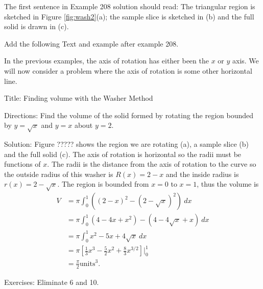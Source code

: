 \documentclass[10pt]{article}
\begin{document}
The first sentence in Example 208 solution should read:   The triangular region is sketched in Figure \ref{fig:wash2}(a); the sample slice is sketched in (b) and the full solid is drawn in (c). 


Add the following Text and example after example 208.

In the previous examples, the axis of rotation has either been the $x$ or $y$ axis. We will now consider a problem where the axis of rotation is some other horizontal line.

Title: Finding volume with the Washer Method

Directions:  Find the volume of the solid formed by rotating the region bounded by $y=\sqrt x$ and $y=x$ about $y=2$.

Solution:  Figure ????? shows the region we are rotating (a), a sample slice (b) and the full solid (c). The axis of rotation is horizontal so the radii must be functions of $x$. The radii is the distance from the axis of rotation to the curve so the outside radius of this washer is $R(x)=2-x$ and the inside radius is $r(x)=2-\sqrt x$. The region is bounded from  $x=0$ to $x=1$, thus the volume is
\begin{align*}
V&=\pi \int_0^1 \left( (2-x)^2-(2-\sqrt x)^2\right) ~dx\\
&=\pi \int_0^1 (4-4x+x^2)-(4-4\sqrt x+x)~dx\\
&=\pi \int_0^1 x^2 -5x+4\sqrt x ~dx\\
&=\pi \left[\frac13 x^3-\frac52 x^2+\frac83 x^{3/2}\right]\Big|_0^1\\
&=\frac{\pi}{2} \text{units}^3.
\end{align*}


Exercises:  Eliminate 6 and 10.
\end{document}
